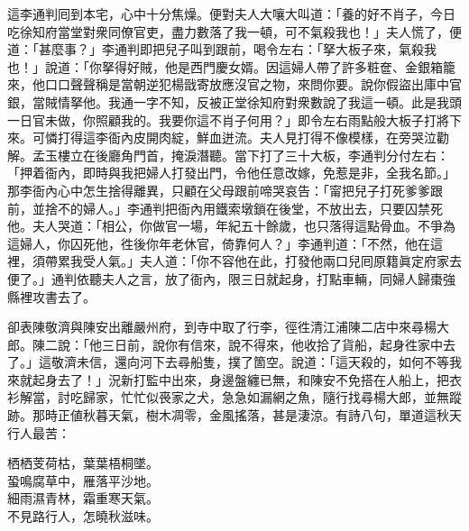 這李通判囘到本宅，心中十分焦燥。便對夫人大嚷大叫道：「養的好不肖子，今日吃徐知府當堂對衆同僚官吏，盡力數落了我一頓，可不氣殺我也！」夫人慌了，便道：「甚麼事？」李通判即把兒子叫到跟前，喝令左右：「拏大板子來，氣殺我也！」說道：「你拏得好賊，他是西門慶女婿。因這婦人帶了許多粧奩、金銀箱籠來，他口口聲聲稱是當朝逆犯楊戩寄放應沒官之物，來問你要。說你假盜出庫中官銀，當賊情拏他。我通一字不知，反被正堂徐知府對衆數說了我這一頓。此是我頭一日官未做，你照顧我的。我要你這不肖子何用？」即令左右雨點般大板子打將下來。可憐打得這李衙內皮開肉綻，鮮血迸流。夫人見打得不像模樣，在旁哭泣勸解。孟玉樓立在後廳角門首，掩淚潛聽。當下打了三十大板，李通判分付左右：「押着衙內，即時與我把婦人打發出門，令他任意改嫁，免惹是非，全我名節。」那李衙內心中怎生捨得離異，只顧在父母跟前啼哭哀告：「甯把兒子打死爹爹跟前，並捨不的婦人。」李通判把衙內用鐵索墩鎖在後堂，不放出去，只要囚禁死他。夫人哭道：「相公，你做官一場，年紀五十餘歲，也只落得這點骨血。不爭為這婦人，你囚死他，徃後你年老休官，倚靠何人？」{}{}李通判道：「不然，他在這裡，須帶累我受人氣。」夫人道：「你不容他在此，打發他兩口兒囘原籍眞定府家去便了。」{}通判依聽夫人之言，放了衙內，限三日就起身，打點車輛，同婦人歸棗強縣裡攻書去了。

卻表陳敬濟與陳安出離嚴州府，到寺中取了行李，徑徃清江浦陳二店中來尋楊大郎。陳二說：「他三日前，說你有信來，說不得來，他收拾了貨船，起身徃家中去了。」{}這敬濟未信，還向河下去尋船隻，撲了箇空。說道：「這天殺的，如何不等我來就起身去了！」{}況新打監中出來，身邊盤纏已無，和陳安不免搭在人船上，把衣衫解當，討吃歸家，忙忙似䘮家之犬，急急如漏網之魚，隨行找尋楊大郎，並無蹤跡。那時正値秋暮天氣，樹木凋零，金風搖落，甚是淒涼。有詩八句，單道這秋天行人最苦：

\begin{myquote}
栖栖芰荷枯，葉葉梧桐墜。\\蛩鳴腐草中，雁落平沙地。\\細雨濕青林，霜重寒天氣。\\不見路行人，怎曉秋滋味。
\end{myquote}

